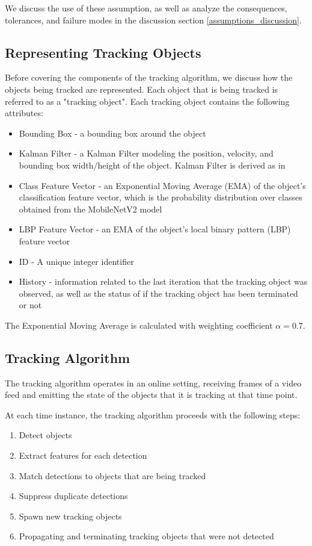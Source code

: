 \documentclass[10pt,twocolumn,letterpaper]{article}
\begin{document}
We discuss the use of these assumption, as well as analyze the consequences, tolerances, and failure modes in the discussion section \ref{assumptions_discussion}.

\subsection{Representing Tracking Objects}
Before covering the components of the tracking algorithm, we discuss how the objects being tracked are represented.
Each object that is being tracked is referred to as a "tracking object".
Each tracking object contains the following attributes:
\begin{itemize}
\item Bounding Box - a bounding box around the object
\item Kalman Filter - a Kalman Filter modeling the position, velocity, and bounding box width/height of the object. Kalman Filter is derived as in \cite{lacey_kalman_filter}
\item Class Feature Vector - an Exponential Moving Average (EMA) of the object's classification feature vector, which is the probability distribution over classes obtained from the MobileNetV2 model \cite{s2018mobilenetv2}
\item LBP Feature Vector - an EMA of the object's local binary pattern (LBP) feature vector \cite{local_bin_patterns}
\item ID - A unique integer identifier
\item History - information related to the last iteration that the tracking object was observed, as well as the status of if the tracking object has been terminated or not
\end{itemize}
The Exponential Moving Average is calculated with weighting coefficient $\alpha = 0.7$.


\label{tracking_algo_subsection}
\subsection{Tracking Algorithm}
The tracking algorithm operates in an online setting, receiving frames of a video feed and emitting the state of the objects that it is tracking at that time point.

At each time instance, the tracking algorithm proceeds with the following steps:
\begin{enumerate}
\item Detect objects
\item Extract features for each detection
\item Match detections to objects that are being tracked
\item Suppress duplicate detections
\item Spawn new tracking objects
\item Propagating and terminating tracking objects that were not detected
\end{enumerate}
\end{document}
